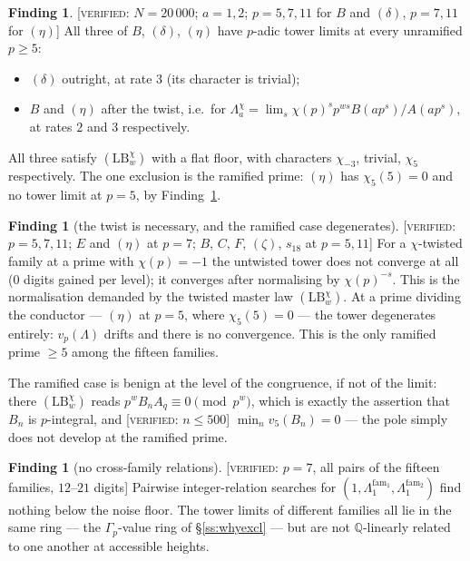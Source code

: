 \documentclass[11pt,reqno]{article}
\newcommand{\QQ}{\mathbb{Q}}
\newcommand{\Gp}{\Gamma_p}
\newcommand{\vp}{v_p}
\newcommand{\VER}[1]{{\normalfont\textsc{[verified:} #1\textsc{]}}}
\theoremstyle{plain}
\theoremstyle{definition}
\newtheorem{finding}[theorem]{Finding}
\theoremstyle{remark}
\numberwithin{equation}{section}
\begin{document}
\begin{finding}\label{find:noarch}
\VER{$N=20\,000$; $a=1,2$; $p=5,7,11$ for $B$ and $(\delta)$, $p=7,11$ for $(\eta)$}
All three of $B$, $(\delta)$, $(\eta)$
have $p$-adic tower limits at every unramified $p\ge5$:
\begin{itemize}[leftmargin=1.5em]
\item $(\delta)$ outright, at rate $3$ (its character is trivial);
\item $B$ and $(\eta)$ after the twist, i.e.\ for
  $\Lambda^\chi_a=\lim_s\chi(p)^{s}p^{ws}B(ap^s)/A(ap^s)$, at rates $2$ and $3$
  respectively.
\end{itemize}
All three satisfy $(\mathrm{LB}_w^\chi)$ with a flat floor, with characters
$\chi_{-3}$, trivial, $\chi_5$ respectively.  The one exclusion is the ramified prime:
$(\eta)$ has $\chi_5(5)=0$ and no tower limit at $p=5$, by
Finding~\textup{\ref{find:twist}}.
\end{finding}

\begin{finding}[the twist is necessary, and the ramified case degenerates]\label{find:twist}
\VER{$p=5,7,11$; $E$ and $(\eta)$ at $p=7$; $B$, $C$, $F$, $(\zeta)$, $s_{18}$
at $p=5,11$}  For a $\chi$-twisted family at a prime with $\chi(p)=-1$
the untwisted tower does not converge at all ($0$ digits gained per level);
it converges after normalising by $\chi(p)^{-s}$.  This is the normalisation
demanded by the twisted master law $(\mathrm{LB}_w^\chi)$.  At a prime dividing
the conductor --- $(\eta)$ at $p=5$, where $\chi_5(5)=0$ --- the tower
degenerates entirely: $\vp(\Lambda)$ drifts and there is no convergence.  This
is the only ramified prime $\ge5$ among the fifteen families.
\end{finding}

The ramified case is benign at the level of the congruence, if not of the limit:
there $(\mathrm{LB}_w^\chi)$ reads $p^{w}B_nA_q\equiv0\pmod{p^{w}}$, which is
exactly the assertion that $B_n$ is $p$-integral, and \VER{$n\le500$}
$\min_n v_5(B_n)=0$ --- the pole simply does not develop at the ramified prime.

\begin{finding}[no cross-family relations]\label{find:cross}
\VER{$p=7$, all pairs of the fifteen families, $12$--$21$ digits}  Pairwise
integer-relation searches for $(1,\Lambda^{\mathrm{fam}_1}_1,
\Lambda^{\mathrm{fam}_2}_1)$ find nothing below the noise floor.  The tower
limits of different families all lie in the same ring --- the $\Gp$-value ring
of \S\ref{ss:whyexcl} --- but are not $\QQ$-linearly related to one another at
accessible heights.
\end{finding}
\end{document}
